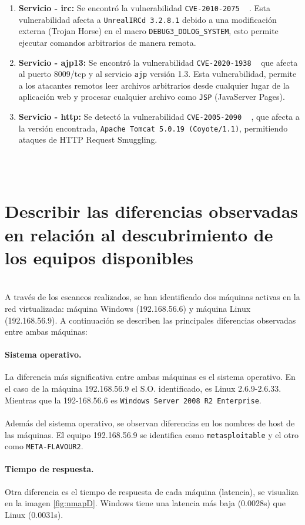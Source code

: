\documentclass[a4paper,12pt]{article} %
\begin{document}
\begin{enumerate}
        \item \textbf{Servicio - irc: } Se encontró la vulnerabilidad \texttt{CVE-2010-2075} ~\cite{cve23} . Esta vulnerabilidad afecta a \texttt{UnrealIRCd 3.2.8.1} debido a una modificación externa (Trojan Horse) en el macro \texttt{DEBUG3\_DOLOG\_SYSTEM}, esto permite ejecutar comandos arbitrarios de manera remota.
        \item \textbf{Servicio - ajp13: } Se encontró la vulnerabilidad \texttt{CVE-2020-1938} ~\cite{cve24}  que afecta al puerto 8009/tcp y al servicio \texttt{ajp} versión 1.3. Esta vulnerabilidad,  permite a los atacantes remotos leer archivos arbitrarios desde cualquier lugar de la aplicación web y procesar cualquier archivo como \texttt{JSP} (JavaServer Pages).
        \item \textbf{Servicio - http: } Se detectó la vulnerabilidad \texttt{CVE-2005-2090} ~\cite{cve25} , que afecta a la versión encontrada, \texttt{Apache Tomcat 5.0.19 (Coyote/1.1)}, permitiendo ataques de HTTP Request Smuggling.
    \end{enumerate}

\\ \\
\section{Describir las diferencias observadas en relación al descubrimiento de los equipos disponibles}
\\
A través de los escaneos realizados, se han identificado dos máquinas activas en la red virtualizada: máquina Windows (192.168.56.6) y máquina Linux (192.168.56.9).  A continuación se describen las principales diferencias observadas entre ambas máquinas:

\paragraph{Sistema operativo.}
La diferencia más significativa entre ambas máquinas es el sistema operativo. En el caso de la máquina 192.168.56.9 el S.O. identificado, es Linux 2.6.9-2.6.33. Mientras que la 192-168.56.6 es \texttt{Windows Server 2008 R2 Enterprise}. \\ \\
Además del sistema operativo, se observan diferencias en los nombres de host de las máquinas. El equipo 192.168.56.9 se identifica como \texttt{metasploitable} y el otro como \texttt{META-FLAVOUR2}.

\paragraph{Tiempo de respuesta.}
Otra diferencia es el tiempo de respuesta de cada máquina (latencia), se visualiza en la imagen \ref{fig:nmapD}. Windows tiene una latencia más baja (0.0028s) que Linux (0.0031s). 
\end{document}
